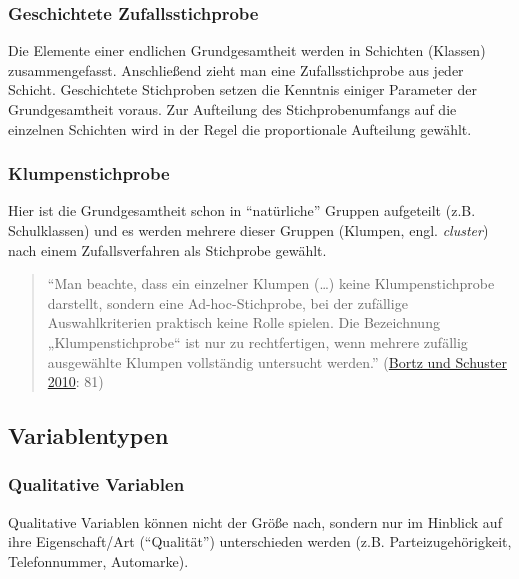 \documentclass[
  11pt,
  ngerman,
  a4paper,
]{report}
\begin{document}
\hypertarget{geschichtete-zufallsstichprobe}{%
\subsubsection{Geschichtete Zufallsstichprobe}\label{geschichtete-zufallsstichprobe}}

Die Elemente einer endlichen Grundgesamtheit werden in Schichten (Klassen) zusammengefasst. Anschließend zieht man eine Zufallsstichprobe aus jeder Schicht. Geschichtete Stichproben setzen die Kenntnis einiger Parameter der Grundgesamtheit voraus. Zur Aufteilung des Stichprobenumfangs auf die einzelnen Schichten wird in der Regel die proportionale Aufteilung gewählt.

\hypertarget{klumpenstichprobe}{%
\subsubsection{Klumpenstichprobe}\label{klumpenstichprobe}}

Hier ist die Grundgesamtheit schon in \enquote{natürliche} Gruppen aufgeteilt (z.B. Schulklassen) und es werden mehrere dieser Gruppen (Klumpen, engl. \emph{cluster}) nach einem Zufallsverfahren als Stichprobe gewählt.

\begin{quote}
\enquote{Man beachte, dass ein einzelner Klumpen (\ldots) keine Klumpenstichprobe darstellt, sondern eine Ad-hoc-Stichprobe, bei der zufällige Auswahlkriterien praktisch keine Rolle spielen. Die Bezeichnung „Klumpenstichprobe`` ist nur zu rechtfertigen, wenn mehrere zufällig ausgewählte Klumpen vollständig untersucht werden.} (\protect\hyperlink{ref-bortz}{Bortz und Schuster 2010}: 81)
\end{quote}

\hypertarget{variablentypen}{%
\subsection{Variablentypen}\label{variablentypen}}

\nopagebreak

\hypertarget{qualitative-variablen}{%
\subsubsection{Qualitative Variablen}\label{qualitative-variablen}}

Qualitative Variablen können nicht der Größe nach, sondern nur im Hinblick auf ihre Eigenschaft/Art (\enquote{Qualität}) unterschieden werden (z.B. Parteizugehörigkeit, Telefonnummer, Automarke).
\end{document}
